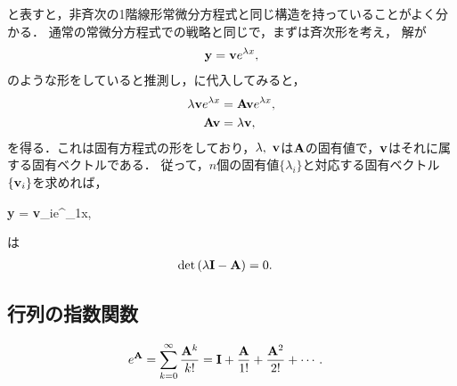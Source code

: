 %
と表すと，非斉次の1階線形常微分方程式と同じ構造を持っていることがよく分かる．
通常の常微分方程式での戦略と同じで，まずは斉次形を考え，
解が
\begin{align}
  {\bf y} = {\bf v}e^{\lambda x},
\end{align}
のような形をしていると推測し，に代入してみると，
%
\begin{align}
 \lambda{\bf v}e^{\lambda x} & ={\bf A}{\bf v}e^{\lambda x},\\
 {\bf A}{\bf v} & = \lambda {\bf v},
\end{align}
を得る．これは固有方程式の形をしており，$\lambda,~{\bf v}$は${\bf A}$の固有値で，${\bf v}$はそれに属する固有ベクトルである．
従って，$n$個の固有値$\{\lambda_{i}\}$と対応する固有ベクトル$\{{\bf v}_{i}\}$を求めれば，

  {\bf y} = {\bf v}_{i}e^{\lambda_{1}x},

は\Eq{}
\begin{align}
  \det\left(\lambda{\bf I}-{\bf A}\right) & =0.
\end{align}
%
\subsection{行列の指数関数}
%
\begin{align}
 e^{{\bf A}} & =\sum_{k=0}^{\infty}\dfrac{{\bf A}^{k}}{k!}={\bf I}+\dfrac{{\bf A}}{1!}+\dfrac{{\bf A}^{2}}{2!}+\cdots.
\end{align}